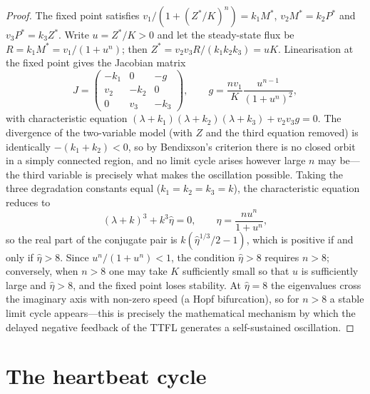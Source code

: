 \begin{proof}
The fixed point satisfies $v_1/(1+(Z^*/K)^n) = k_1 M^*$, $v_2 M^* = k_2 P^*$ and $v_3 P^* = k_3 Z^*$. Write $u = Z^*/K > 0$ and let the steady-state flux be $R = k_1 M^* = v_1/(1+u^n)$; then $Z^* = v_2v_3R/(k_1k_2k_3) = uK$. Linearisation at the fixed point gives the Jacobian matrix
\[
J = \begin{pmatrix}
-k_1 & 0 & -g\\
v_2 & -k_2 & 0\\
0 & v_3 & -k_3
\end{pmatrix},
\qquad
g = \frac{n v_1}{K}\frac{u^{n-1}}{(1+u^n)^2},
\]
with characteristic equation $(\lambda+k_1)(\lambda+k_2)(\lambda+k_3) + v_2v_3g = 0$. The divergence of the two-variable model (with $Z$ and the third equation removed) is identically $-(k_1+k_2) < 0$, so by Bendixson's criterion there is no closed orbit in a simply connected region, and no limit cycle arises however large $n$ may be---the third variable is precisely what makes the oscillation possible. Taking the three degradation constants equal ($k_1 = k_2 = k_3 = k$), the characteristic equation reduces to
\[
(\lambda+k)^3 + k^3\hat\eta = 0,\qquad \hat\eta = \frac{n u^n}{1+u^n},
\]
so the real part of the conjugate pair is $k(\hat\eta^{1/3}/2 - 1)$, which is positive if and only if $\hat\eta > 8$. Since $u^n/(1+u^n) < 1$, the condition $\hat\eta > 8$ requires $n > 8$; conversely, when $n > 8$ one may take $K$ sufficiently small so that $u$ is sufficiently large and $\hat\eta > 8$, and the fixed point loses stability. At $\hat\eta = 8$ the eigenvalues cross the imaginary axis with non-zero speed (a Hopf bifurcation), so for $n > 8$ a stable limit cycle appears---this is precisely the mathematical mechanism by which the delayed negative feedback of the TTFL generates a self-sustained oscillation.
\end{proof}

\section{The heartbeat cycle}

